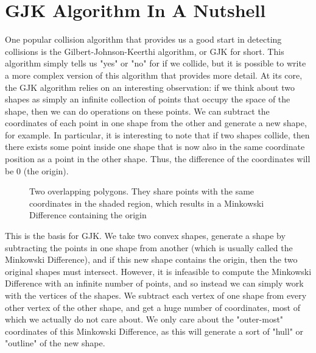 \documentclass{article}
\begin{document}
\section{GJK Algorithm In A Nutshell}
One popular collision algorithm that provides us a good start in detecting collisions is the Gilbert-Johnson-Keerthi algorithm, or GJK for short. This algorithm simply tells us "yes" or "no" for if we collide, but it is possible to write a more complex version of this algorithm that provides more detail. At its core, the GJK algorithm relies on an interesting observation: if we think about two shapes as simply an infinite collection of points that occupy the space of the shape, then we can do operations on these points. We can subtract the coordinates of each point in one shape from the other and generate a new shape, for example. In particular, it is interesting to note that if two shapes collide, then there exists some point inside one shape that is now also in the same coordinate position as a point in the other shape. Thus, the difference of the coordinates will be 0 (the origin).\\
\begin{figure}[H]
    \centering
    \caption{Two overlapping polygons. They share points with the same coordinates in the shaded region, which results in a Minkowski Difference containing the origin}
\end{figure}
This is the basis for GJK. We take two convex shapes, generate a shape by subtracting the points in one shape from another (which is usually called the Minkowski Difference), and if this new shape contains the origin, then the two original shapes must intersect. However, it is infeasible to compute the Minkowski Difference with an infinite number of points, and so instead we can simply work with the vertices of the shapes. We subtract each vertex of one shape from every other vertex of the other shape, and get a huge number of coordinates, most of which we actually do not care about. We only care about the "outer-most" coordinates of this Minkowski Difference, as this will generate a sort of "hull" or "outline" of the new shape. \\
\end{document}
